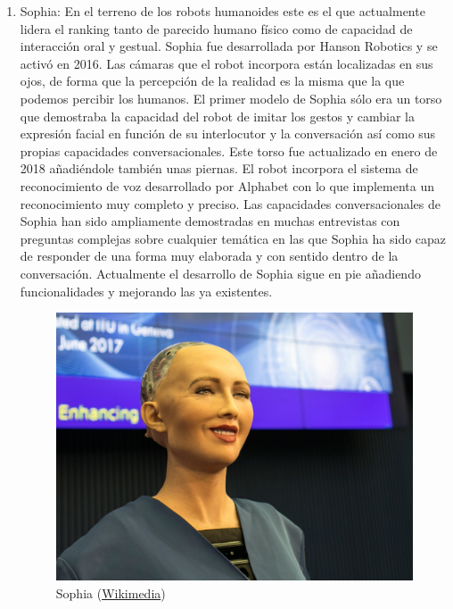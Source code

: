 \begin{enumerate}
  \item Sophia: En el terreno de los robots humanoides este es el que actualmente lidera el ranking tanto de parecido humano físico como de capacidad de interacción oral y gestual. Sophia fue desarrollada por Hanson Robotics y se activó en 2016. Las cámaras que el robot incorpora están localizadas en sus ojos, de forma que la percepción de la realidad es la misma que la que podemos percibir los humanos. El primer modelo de Sophia sólo era un torso que demostraba la capacidad del robot de imitar los gestos y cambiar la expresión facial en función de su interlocutor y la conversación así como sus propias capacidades conversacionales. Este torso fue actualizado en enero de 2018 añadiéndole también unas piernas. El robot incorpora el sistema de reconocimiento de voz desarrollado por Alphabet con lo que implementa un reconocimiento muy completo y preciso. Las capacidades conversacionales de Sophia han sido ampliamente demostradas en muchas entrevistas con preguntas complejas sobre cualquier temática en las que Sophia ha sido capaz de responder de una forma muy elaborada y con sentido dentro de la conversación. Actualmente el desarrollo de Sophia sigue en pie añadiendo funcionalidades y mejorando las ya existentes.
  \begin{figure}[!h]
  	\centering
  	\includegraphics[scale=0.4]{./EtapaModerna/Imagenes/sophia.jpg}
  	\caption{Sophia (\href{https://es.wikipedia.org/wiki/Archivo:Sophia_(robot).jpg}{Wikimedia})}
  	\label{fig:sophia}
  \end{figure}
\end{enumerate}
